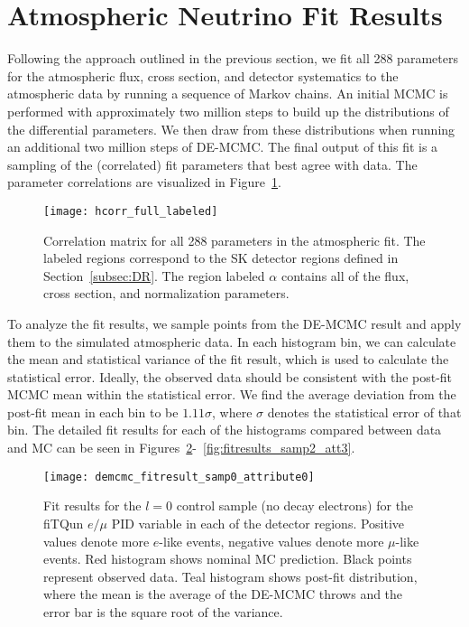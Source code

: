 

\section{Atmospheric Neutrino Fit Results}
\label{sec:fitresults}

Following the approach outlined in the previous section, we fit all 288
parameters for the atmospheric flux, cross section, and detector systematics to
the atmospheric data by running a sequence of Markov chains.  An initial MCMC is
performed with approximately two million steps to build up the distributions of
the differential parameters.  We then draw from these distributions when running
an additional two million steps of DE-MCMC\@.  The final output of this fit is 
a sampling of the (correlated) fit parameters that best agree with data. The parameter
correlations are visualized in Figure~\ref{fig:fitcorr}.

\begin{figure}[h]
  \begin{center}
    \texttt{[image: hcorr\_full\_labeled]}
  \end{center}
  \caption{Correlation matrix for all 288 parameters in the atmospheric fit.
  The labeled regions correspond to the SK detector regions defined in
  Section~\ref{subsec:DR}.  The region labeled $\alpha$ contains all of the
  flux, cross section, and normalization parameters.}
  \label{fig:fitcorr}
\end{figure}

To analyze the fit results, we
sample points from the DE-MCMC result and apply them to the simulated
atmospheric data\@.  In each histogram bin, we can calculate the mean and
statistical variance of the fit result, which is used to calculate the
statistical error.  Ideally, the observed data should be consistent with the
post-fit MCMC mean within the statistical error.  We find the average deviation
from the post-fit mean in each bin to be $1.11\sigma$, where $\sigma$ denotes
the statistical error of that bin.  The detailed fit results for each of the
histograms compared between data and MC can be seen in
Figures~\ref{fig:fitresults_samp0_att0}-~\ref{fig:fitresults_samp2_att3}.

\begin{figure}[h]
  \begin{center}
    \texttt{[image: demcmc\_fitresult\_samp0\_attribute0]} 
  \end{center}
  \caption{Fit results for the $l=0$ control sample (no decay electrons) for
  the fiTQun $e/\mu$ PID variable in each of the detector regions.  Positive
  values denote more $e$-like events, negative values denote more $\mu$-like
  events.  Red histogram shows nominal MC prediction.  Black points represent
  observed data.  Teal histogram shows post-fit distribution, where the mean is
  the average of the DE-MCMC throws and the error bar is the square root of the
  variance.}
  \label{fig:fitresults_samp0_att0}
\end{figure}


